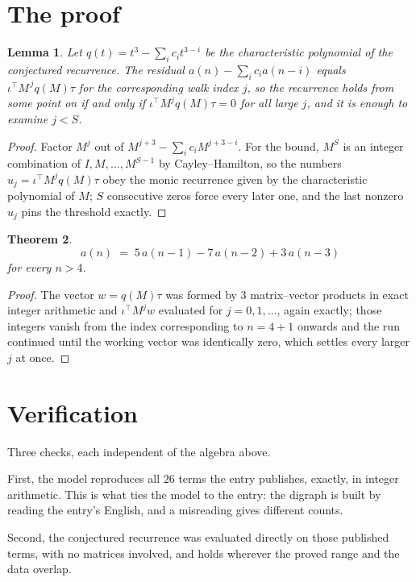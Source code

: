 \documentclass[11pt,a4paper]{article}
\theoremstyle{plain}
\newtheorem{theorem}{Theorem}
\newtheorem{lemma}[theorem]{Lemma}
\theoremstyle{definition}
\begin{document}
\section{The proof}

\begin{lemma}\label{lem:crit}
Let $q(t)=t^{3}-\sum_i c_it^{3-i}$ be the characteristic polynomial of the
conjectured recurrence. The residual $a(n)-\sum_ic_ia(n-i)$ equals
$\iota^{\!\top}M^{\,j}q(M)\tau$ for the corresponding walk index $j$, so the recurrence
holds from some point on if and only if $\iota^{\!\top}M^{j}q(M)\tau=0$ for all large $j$,
and it is enough to examine $j<S$.
\end{lemma}

\begin{proof}
Factor $M^{j}$ out of $M^{j+3}-\sum_ic_iM^{j+3-i}$. For the bound, $M^{S}$
is an integer combination of $I,M,\dots,M^{S-1}$ by Cayley--Hamilton, so the numbers
$u_j=\iota^{\!\top}M^{j}q(M)\tau$ obey the monic recurrence given by the characteristic
polynomial of $M$; $S$ consecutive zeros force every later one, and the last nonzero $u_j$
pins the threshold exactly.
\end{proof}

\begin{theorem}
\[
a(n)\;=\;5\,a(n-1) - 7\,a(n-2) + 3\,a(n-3)
\]
for every $n>4$.
\end{theorem}

\begin{proof}
The vector $w=q(M)\tau$ was formed by $3$ matrix--vector products in exact integer
arithmetic and $\iota^{\!\top}M^{j}w$ evaluated for $j=0,1,\dots$, again exactly; those
integers vanish from the index corresponding to $n=4+1$ onwards and the run continued
until the working vector was identically zero, which settles every larger $j$ at once.
\end{proof}

\section{Verification}

Three checks, each independent of the algebra above.

First, the model reproduces all $26$ terms the entry publishes, exactly, in integer
arithmetic. This is what ties the model to the entry: the digraph is built by reading the
entry's English, and a misreading gives different counts.

Second, the conjectured recurrence was evaluated directly on those published terms, with no
matrices involved, and holds wherever the proved range and the data overlap.
\end{document}
